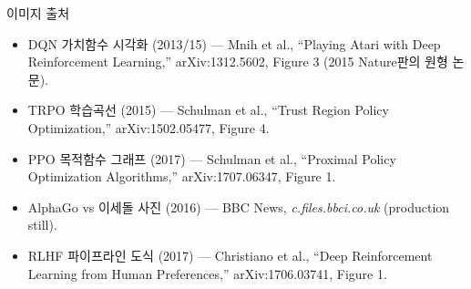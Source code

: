 \begin{frame}{이미지 출처}
{\begin{itemize}
      \textit{Machine Learning} 3(1), Figure 4.
\item DQN 가치함수 시각화 (2013/15) --- Mnih et al., ``Playing
      Atari with Deep Reinforcement Learning,'' arXiv:1312.5602,
      Figure 3 (2015 Nature판의 원형 논문).
\item TRPO 학습곡선 (2015) --- Schulman et al., ``Trust Region
      Policy Optimization,'' arXiv:1502.05477, Figure 4.
\item PPO 목적함수 그래프 (2017) --- Schulman et al., ``Proximal
      Policy Optimization Algorithms,'' arXiv:1707.06347, Figure 1.
\item AlphaGo vs 이세돌 사진 (2016) --- BBC News,
      \textit{c.files.bbci.co.uk} (production still).
\item RLHF 파이프라인 도식 (2017) --- Christiano et al., ``Deep
      Reinforcement Learning from Human Preferences,''
      arXiv:1706.03741, Figure 1.
\end{itemize}}
\end{frame}
